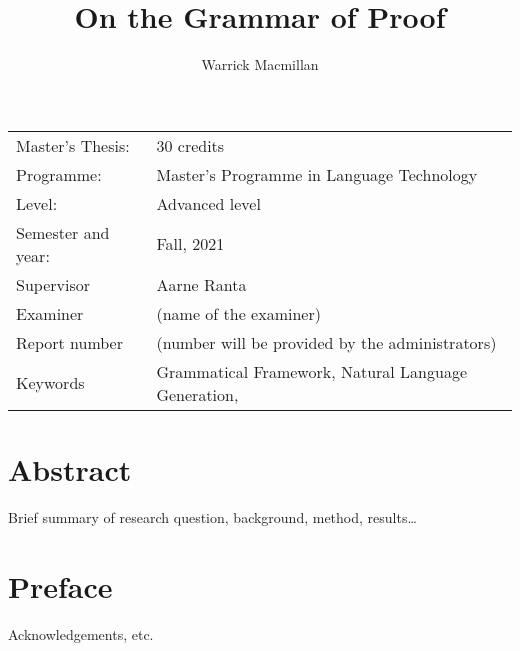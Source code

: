 \documentclass[11pt, a4paper]{article}
\title{On the Grammar of Proof}
\author{Warrick Macmillan}
\begin{document}
\begin{titlepage}

\maketitle

\vfill

\begingroup
\renewcommand*{\arraystretch}{1.2}
\begin{tabular}{l@{\hskip 20mm}l}
\hline
Master's Thesis: & 30 credits\\
Programme: & Master’s Programme in Language Technology\\
Level: & Advanced level \\
Semester and year: & Fall, 2021\\
Supervisor & Aarne Ranta\\
Examiner & (name of the examiner)\\
Report number & (number will be provided by the administrators) \\
Keywords &  Grammatical Framework, Natural Language Generation,\\
\end{tabular}
\endgroup

\thispagestyle{empty}
\end{titlepage}

\newpage
\singlespacing
\section*{Abstract}

Brief summary of research question, background, method, results\ldots

\thispagestyle{empty}

\newpage
\section*{Preface}

Acknowledgements, etc.
\end{document}
